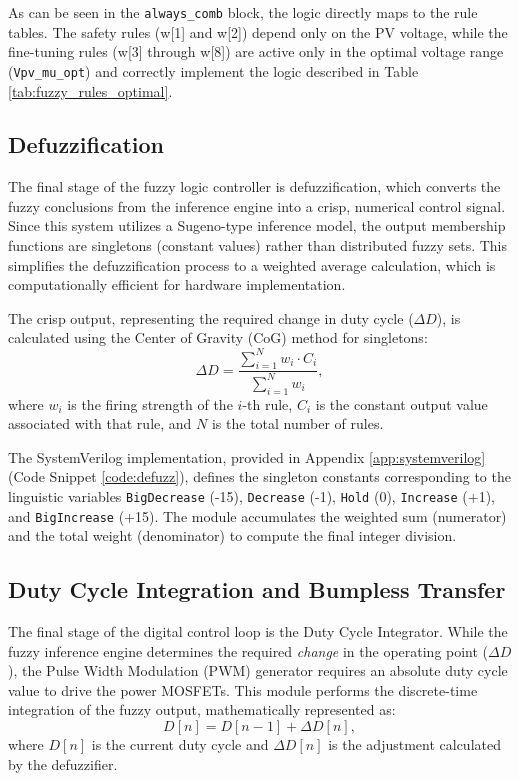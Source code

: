 \documentclass[a4paper,oneside,12pt]{report}
\numberwithin{equation}{chapter}
\begin{document}
As can be seen in the \texttt{always\_comb} block, the logic directly maps to the rule tables. The safety rules (w[1] and w[2]) depend only on the PV voltage, while the fine-tuning rules (w[3] through w[8]) are active only in the optimal voltage range (\texttt{Vpv\_mu\_opt}) and correctly implement the logic described in Table \ref{tab:fuzzy_rules_optimal}.

\subsection{Defuzzification}\label{sec:sv_defuzzification}
The final stage of the fuzzy logic controller is defuzzification, which converts the fuzzy conclusions from the inference engine into a crisp, numerical control signal. Since this system utilizes a Sugeno-type inference model, the output membership functions are singletons (constant values) rather than distributed fuzzy sets. This simplifies the defuzzification process to a weighted average calculation, which is computationally efficient for hardware implementation.

The crisp output, representing the required change in duty cycle ($\Delta D$), is calculated using the Center of Gravity (CoG) method for singletons:
\begin{equation}
    \Delta D = \frac{\sum_{i=1}^{N} w_i \cdot C_i}{\sum_{i=1}^{N} w_i},
\end{equation}
where $w_i$ is the firing strength of the $i$-th rule, $C_i$ is the constant output value associated with that rule, and $N$ is the total number of rules.

The SystemVerilog implementation, provided in Appendix \ref{app:systemverilog} (Code Snippet \ref{code:defuzz}), defines the singleton constants corresponding to the linguistic variables \texttt{Big\textunderscore Decrease} (-15), \texttt{Decrease} (-1), \texttt{Hold} (0), \texttt{Increase} (+1), and \texttt{Big\textunderscore Increase} (+15). The module accumulates the weighted sum (numerator) and the total weight (denominator) to compute the final integer division.
\subsection{Duty Cycle Integration and Bumpless Transfer}
\label{sec:sv_duty_integrator}
The final stage of the digital control loop is the Duty Cycle Integrator. While the fuzzy inference engine determines the required \textit{change} in the operating point ($\Delta D$), the Pulse Width Modulation (PWM) generator requires an absolute duty cycle value to drive the power MOSFETs. This module performs the discrete-time integration of the fuzzy output, mathematically represented as:
\begin{equation}
    D[n] = D[n-1] + \Delta D[n],
\end{equation}
where $D[n]$ is the current duty cycle and $\Delta D[n]$ is the adjustment calculated by the defuzzifier.
\end{document}
